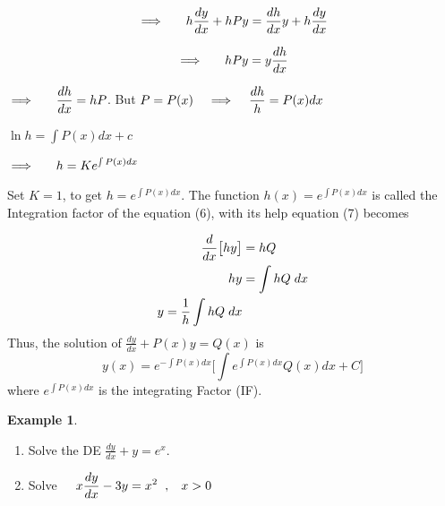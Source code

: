 \documentclass[11pt,a4paper]{article}
\theoremstyle{definition}
\newtheorem{exa}[thm]{Example}
\begin{document}
$$\implies\hspace{0.5cm} h\frac{dy}{dx} + hPy = \frac{dh}{dx}y + h\frac{dy}{dx}$$

$$\implies\hspace{0.5cm} h Py = y \frac{dh}{dx}$$

$\displaystyle{\implies\hspace{0.5cm} \frac{dh}{dx} = h P}$. But  $P = P(x) \hspace{0.3cm}\implies \hspace{0.3cm} \displaystyle{\dfrac{dh}{h} = P(x)dx}$

$\ln h = \int P(x)dx + c$


$\displaystyle{\implies \hspace{0.5cm} h = Ke^{\int P(x)dx}}$


Set $K=1$, to get $\displaystyle{h =e^{\int P(x)dx}}$. The function $\displaystyle{h(x) = e^{\int P(x)dx}}$ is called the Integration factor of the equation (6), with its help equation (7) becomes

\begin{align*}
\frac{d}{dx}\big[hy\big] & = hQ\\
hy & = \int hQ\hspace{0.1cm}dx\\
y = \frac{1}{h}\int hQ\hspace{0.1cm} dx
\end{align*}
Thus, the solution of $\displaystyle{\frac{dy}{dx} + P(x)y = Q(x)}$ is $$y(x) = e^{-\int P(x)dx}\Bigg[\int e^{\int P(x)dx}Q(x)dx + C\Bigg]$$
where $\displaystyle{e^{\int P(x)dx}}$ is the integrating Factor (IF).


\begin{exa}
\begin{enumerate}
\item Solve the DE $\displaystyle{\frac{dy}{dx} + y = e^x}$.
\item Solve $\hspace{0.4cm} \displaystyle{x\frac{dy}{dx} - 3y = x^2 \hspace{0.2cm} , \hspace{0.3cm} x>0}$
\end{enumerate}
\end{exa}
\end{document}
